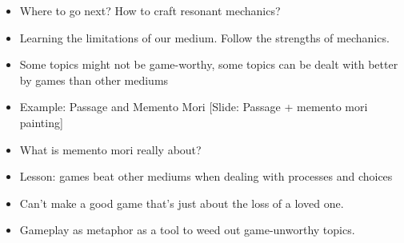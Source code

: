 \documentclass[12pt]{article}
\begin{document}
{\begin{itemize}
\item Where to go next?  How to craft resonant mechanics?
 
\item Learning the limitations of our medium.  Follow the strengths of mechanics.
 
\item Some topics might not be game-worthy, some topics can be dealt with better by games than other mediums

\item Example:  Passage and Memento Mori [Slide: Passage + memento mori painting]

\item What is memento mori really about?

\item Lesson:  games beat other mediums when dealing with processes and choices

\item Can't make a good game that's just about the loss of a loved one.

\item Gameplay as metaphor as a tool to weed out game-unworthy topics.

\end{itemize}
}
\end{document}
